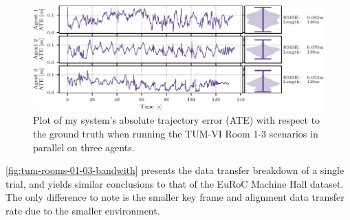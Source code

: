 \begin{figure}[h]
    \centering
    \includegraphics[width=0.9\linewidth]{figures/apr11_tum_room_trajectory_a_line_plot.pdf}

    \caption{Plot of my system's absolute trajectory error (ATE) with respect to the ground truth when running the TUM-VI Room 1-3 scenarios in parallel on three agents.}
    \label{fig:tum-room-01-03-line-plot}
\end{figure}

\autoref{fig:tum-rooms-01-03-bandwith} presents the data transfer breakdown of a single trial, and yields similar conclusions to that of the EuRoC Machine Hall dataset. The only difference to note is the smaller key frame and alignment data transfer rate due to the smaller environment.

